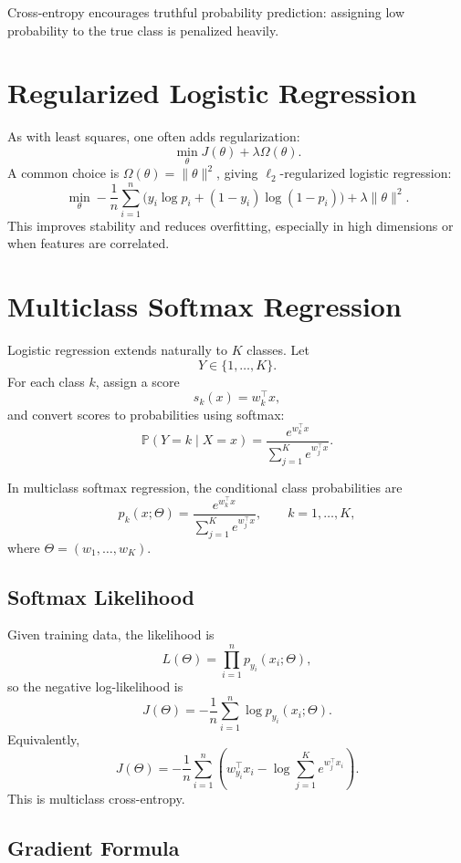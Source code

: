 Cross-entropy encourages truthful probability prediction: assigning low probability to the true class is penalized heavily.

\section{Regularized Logistic Regression}

As with least squares, one often adds regularization:
\[
\min_\theta J(\theta)+\lambda \Omega(\theta).
\]
A common choice is $\Omega(\theta)=\|\theta\|^2$, giving $\ell_2$-regularized logistic regression:
\[
\min_\theta
-\frac1n\sum_{i=1}^n
\Big(
y_i\log p_i+(1-y_i)\log(1-p_i)
\Big)
+\lambda \|\theta\|^2.
\]
This improves stability and reduces overfitting, especially in high dimensions or when features are correlated.

\section{Multiclass Softmax Regression}

Logistic regression extends naturally to $K$ classes. Let
\[
Y\in\{1,\dots,K\}.
\]
For each class $k$, assign a score
\[
s_k(x)=w_k^\top x,
\]
and convert scores to probabilities using softmax:
\[
\mathbb P(Y=k\mid X=x)
=
\frac{e^{w_k^\top x}}{\sum_{j=1}^K e^{w_j^\top x}}.
\]

\begin{definition}
In multiclass softmax regression, the conditional class probabilities are
\[
p_k(x;\Theta)
=
\frac{e^{w_k^\top x}}{\sum_{j=1}^K e^{w_j^\top x}},
\qquad k=1,\dots,K,
\]
where $\Theta=(w_1,\dots,w_K)$.
\end{definition}

\subsection{Softmax Likelihood}

Given training data, the likelihood is
\[
L(\Theta)=\prod_{i=1}^n p_{y_i}(x_i;\Theta),
\]
so the negative log-likelihood is
\[
J(\Theta)
=
-\frac1n\sum_{i=1}^n \log p_{y_i}(x_i;\Theta).
\]
Equivalently,
\[
J(\Theta)
=
-\frac1n\sum_{i=1}^n
\left(
w_{y_i}^\top x_i
-
\log \sum_{j=1}^K e^{w_j^\top x_i}
\right).
\]
This is multiclass cross-entropy.

\subsection{Gradient Formula}

